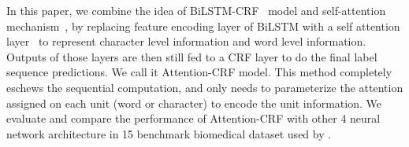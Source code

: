 In this paper, we combine the idea of BiLSTM-CRF~\citep{habibi2017deep} model and self-attention mechanism~\citep{vaswani2017attention}, by replacing feature encoding layer of BiLSTM with a self attention layer~\citep{vaswani2017attention} to represent character level information and word level information. Outputs of those layers are then still fed to a CRF layer to do the final label sequence predictions. We call it Attention-CRF model. This method completely eschews the sequential computation, and only needs to parameterize the attention assigned on each unit (word or character) to encode the unit information. We evaluate and compare the performance of Attention-CRF with other 4 neural network architecture in 15 benchmark biomedical dataset used by \citep{crichton2017neural}.